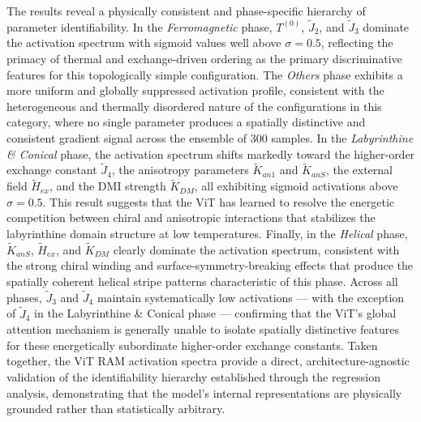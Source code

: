 \documentclass[a4paper,fleqn]{cas-sc}
\begin{document}
The results reveal a physically consistent and
phase-specific hierarchy of parameter identifiability.
In the \textit{Ferromagnetic} phase, $T^{(0)}$,
$\tilde{J}_2$, and $\tilde{J}_3$ dominate the
activation spectrum with sigmoid values well above
$\sigma = 0.5$, reflecting the primacy of thermal and
exchange-driven ordering as the primary discriminative
features for this topologically simple configuration.
The \textit{Others} phase exhibits a more uniform and
globally suppressed activation profile, consistent with
the heterogeneous and thermally disordered nature of
the configurations in this category, where no single
parameter produces a spatially distinctive and
consistent gradient signal across the ensemble of
300 samples. In the \textit{Labyrinthine \& Conical}
phase, the activation spectrum shifts markedly toward
the higher-order exchange constant $\tilde{J}_4$,
the anisotropy parameters $\tilde{K}_{an1}$ and
$\tilde{K}_{anS}$, the external field $\tilde{H}_{ex}$,
and the DMI strength $\tilde{K}_{DM}$, all exhibiting
sigmoid activations above $\sigma = 0.5$. This result
suggests that the ViT has learned to resolve the
energetic competition between chiral and anisotropic
interactions that stabilizes the labyrinthine domain
structure at low temperatures. Finally, in the
\textit{Helical} phase, $\tilde{K}_{anS}$,
$\tilde{H}_{ex}$, and $\tilde{K}_{DM}$ clearly
dominate the activation spectrum, consistent with
the strong chiral winding and surface-symmetry-breaking
effects that produce the spatially coherent helical
stripe patterns characteristic of this phase.
Across all phases, $\tilde{J}_3$ and $\tilde{J}_4$
maintain systematically low activations --- with the
exception of $\tilde{J}_4$ in the Labyrinthine \&
Conical phase --- confirming that the ViT's global
attention mechanism is generally unable to isolate
spatially distinctive features for these energetically
subordinate higher-order exchange constants. Taken
together, the ViT RAM activation spectra provide a
direct, architecture-agnostic validation of the
identifiability hierarchy established through the
regression analysis, demonstrating that the model's
internal representations are physically grounded
rather than statistically arbitrary.
\end{document}
